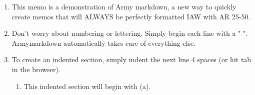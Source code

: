 

\begin{enumerate}
\item This memo is a demonstration of Army markdown, a new way to quickly create memos that will ALWAYS be perfectly formatted IAW with AR 25-50.
\item Don't worry about numbering or lettering. Simply begin each line with a "-". Armymarkdown automatically takes care of everything else.
\item To create an indented section, simply indent the next line 4 spaces (or hit tab in the browser).

\begin{enumerate}
\item This indented section will begin with (a).
\end{enumerate}
\end{enumerate}

